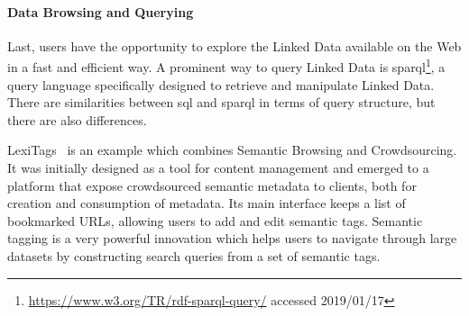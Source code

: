 \paragraph{Data Browsing and Querying}
Last, users have the opportunity to explore the Linked Data available on the Web in a fast and efficient way. A prominent way to query Linked Data is
\gls{sparql}\footnote{\url{https://www.w3.org/TR/rdf-sparql-query/} accessed 2019/01/17}, a query language specifically designed to retrieve and manipulate Linked Data. There are similarities between \gls{sql} and \gls{sparql} in terms of query structure, but there are also differences.

LexiTags~\cite{veres2013} is an example which combines Semantic Browsing and Crowdsourcing. It was initially designed as a tool for content management and emerged to a platform that expose crowdsourced semantic metadata to clients, both for creation and consumption of metadata. Its main interface keeps a list of bookmarked URLs, allowing users to add and edit semantic tags. Semantic tagging is a very powerful innovation which helps users to navigate through large datasets by constructing search queries from a set of semantic tags. 


